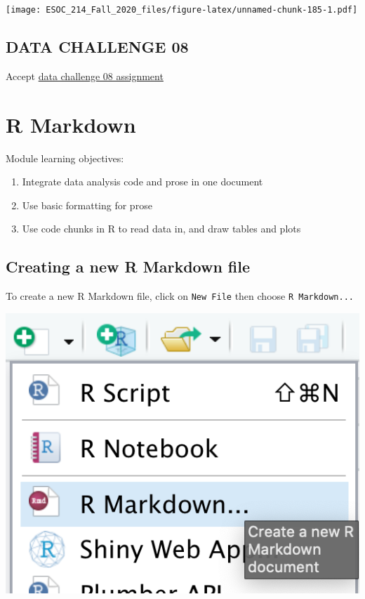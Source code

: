 \documentclass[
]{book}
\begin{document}
\texttt{[image: ESOC\_214\_Fall\_2020\_files/figure-latex/unnamed-chunk-185-1.pdf]}

\hypertarget{data-challenge-08}{%
\section{DATA CHALLENGE 08}\label{data-challenge-08}}

Accept \href{}{data challenge 08 assignment}

\hypertarget{r-markdown}{%
\chapter{R Markdown}\label{r-markdown}}

Module learning objectives:

\begin{enumerate}
\def\labelenumi{\arabic{enumi}.}
\item
  Integrate data analysis code and prose in one document
\item
  Use basic formatting for prose
\item
  Use code chunks in R to read data in, and draw tables and plots
\end{enumerate}

\hypertarget{creating-a-new-r-markdown-file}{%
\section{Creating a new R Markdown file}\label{creating-a-new-r-markdown-file}}

To create a new R Markdown file, click on \texttt{New\ File} then choose \texttt{R\ Markdown...}

\includegraphics[width=7.22in]{images/create_rmarkdown_file}
\end{document}
